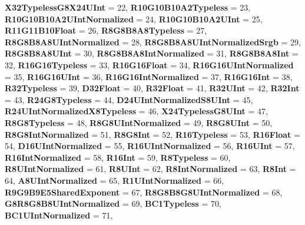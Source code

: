 \begin{DoxyCompactItemize}
{\bfseries X32\+Typeless\+G8\+X24\+U\+Int} = 22, 
{\bfseries R10\+G10\+B10\+A2\+Typeless} = 23, 
{\bfseries R10\+G10\+B10\+A2\+U\+Int\+Normalized} = 24, 
\newline
{\bfseries R10\+G10\+B10\+A2\+U\+Int} = 25, 
{\bfseries R11\+G11\+B10\+Float} = 26, 
{\bfseries R8\+G8\+B8\+A8\+Typeless} = 27, 
{\bfseries R8\+G8\+B8\+A8\+U\+Int\+Normalized} = 28, 
\newline
{\bfseries R8\+G8\+B8\+A8\+U\+Int\+Normalized\+Srgb} = 29, 
{\bfseries R8\+G8\+B8\+A8\+U\+Int} = 30, 
{\bfseries R8\+G8\+B8\+A8\+Int\+Normalized} = 31, 
{\bfseries R8\+G8\+B8\+A8\+Int} = 32, 
\newline
{\bfseries R16\+G16\+Typeless} = 33, 
{\bfseries R16\+G16\+Float} = 34, 
{\bfseries R16\+G16\+U\+Int\+Normalized} = 35, 
{\bfseries R16\+G16\+U\+Int} = 36, 
\newline
{\bfseries R16\+G16\+Int\+Normalized} = 37, 
{\bfseries R16\+G16\+Int} = 38, 
{\bfseries R32\+Typeless} = 39, 
{\bfseries D32\+Float} = 40, 
\newline
{\bfseries R32\+Float} = 41, 
{\bfseries R32\+U\+Int} = 42, 
{\bfseries R32\+Int} = 43, 
{\bfseries R24\+G8\+Typeless} = 44, 
\newline
{\bfseries D24\+U\+Int\+Normalized\+S8\+U\+Int} = 45, 
{\bfseries R24\+U\+Int\+Normalized\+X8\+Typeless} = 46, 
{\bfseries X24\+Typeless\+G8\+U\+Int} = 47, 
{\bfseries R8\+G8\+Typeless} = 48, 
\newline
{\bfseries R8\+G8\+U\+Int\+Normalized} = 49, 
{\bfseries R8\+G8\+U\+Int} = 50, 
{\bfseries R8\+G8\+Int\+Normalized} = 51, 
{\bfseries R8\+G8\+Int} = 52, 
\newline
{\bfseries R16\+Typeless} = 53, 
{\bfseries R16\+Float} = 54, 
{\bfseries D16\+U\+Int\+Normalized} = 55, 
{\bfseries R16\+U\+Int\+Normalized} = 56, 
\newline
{\bfseries R16\+U\+Int} = 57, 
{\bfseries R16\+Int\+Normalized} = 58, 
{\bfseries R16\+Int} = 59, 
{\bfseries R8\+Typeless} = 60, 
\newline
{\bfseries R8\+U\+Int\+Normalized} = 61, 
{\bfseries R8\+U\+Int} = 62, 
{\bfseries R8\+Int\+Normalized} = 63, 
{\bfseries R8\+Int} = 64, 
\newline
{\bfseries A8\+U\+Int\+Normalized} = 65, 
{\bfseries R1\+U\+Int\+Normalized} = 66, 
{\bfseries R9\+G9\+B9\+E5\+Shared\+Exponent} = 67, 
{\bfseries R8\+G8\+B8\+G8\+U\+Int\+Normalized} = 68, 
\newline
{\bfseries G8\+R8\+G8\+B8\+U\+Int\+Normalized} = 69, 
{\bfseries B\+C1\+Typeless} = 70, 
{\bfseries B\+C1\+U\+Int\+Normalized} = 71, 

\end{DoxyCompactItemize}
